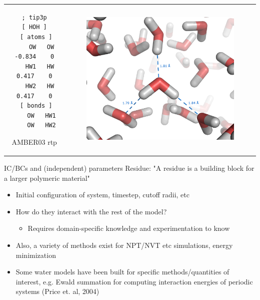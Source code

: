 \documentclass{beamer}
\begin{document}

\begin{frame}[fragile]
\begin{tabular}{cc}
\begin{minipage}{0.5\textwidth}
{\scriptsize
\begin{verbatim}
; tip3p
[ HOH ]
 [ atoms ]
    OW   OW   -0.834    0
   HW1   HW    0.417    0
   HW2   HW    0.417    0
 [ bonds ]
    OW   HW1
    OW   HW2
\end{verbatim}
}
{\footnotesize AMBER03 rtp}
\end{minipage}
&
\begin{minipage}{0.5\textwidth}
\includegraphics[width=0.8\textwidth]{images/tip3p}
\end{minipage}
\end{tabular}
\end{frame}


\begin{frame}{IC/BCs and (independent) parameters}
Residue: "A residue is a building block for a larger polymeric material"
\begin{itemize}
    \item Initial configuration of system, timestep, cutoff radii, etc
    \item How do they interact with the rest of the model?
    \begin{itemize}
        \item Requires domain-specific knowledge and experimentation to know
    \end{itemize}
    \item Also, a variety of methods exist for NPT/NVT etc simulations, energy
        minimization
    \item Some water models have been built for specific
        methods/quantities of interest, e.g. Ewald summation for computing
        interaction energies of periodic systems (Price et. al, 2004)
\end{itemize}
\end{frame}
\end{document}
